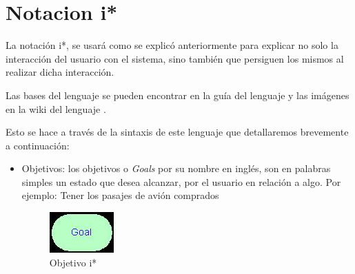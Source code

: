 \section{Notacion i*}
    \par La notación \gls{i*}, se usará como se explicó anteriormente para explicar no solo la interacción del usuario con el sistema, sino también que persiguen los mismos al realizar dicha interacción.
    \par Las bases del lenguaje se pueden encontrar en la guía del lenguaje \cite{Dalpiaz2016} y las imágenes en la wiki del lenguaje \cite{No-mention2011}.
    \par Esto se hace a través de la sintaxis de este lenguaje que detallaremos brevemente a continuación:
    \begin{itemize}
        \item Objetivos: los objetivos o \textit{Goals} por su nombre en inglés, son en palabras simples un estado que desea alcanzar, por el usuario en relación a algo. Por ejemplo: \guillemotleft Tener los pasajes de avión comprados \guillemotright
        \begin{figure}[H]
            \centering
            \includegraphics{media/imagenes/i_star/sintaxis/goal.jpg}
            \caption{Objetivo \gls{i*}}
        \end{figure}


\end{itemize}
